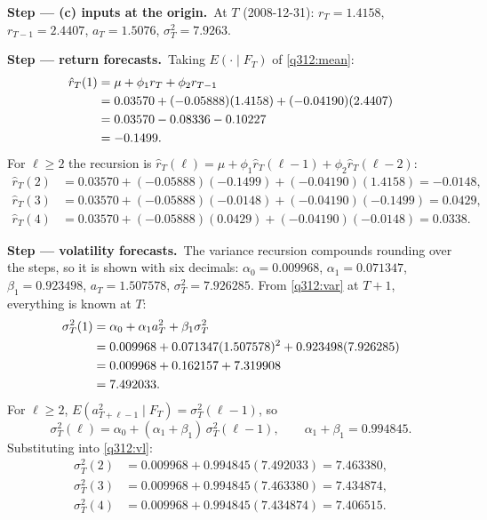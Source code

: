 \documentclass[11pt,a4paper]{article}
\newcommand{\passo}[2]{\par\smallskip\noindent\textbf{Step --- #1.}~#2}
\begin{document}
\begin{sol}
\passo{(c) inputs at the origin}{At $T$ (2008-12-31): $r_T=1.4158$, $r_{T-1}=2.4407$, $a_T=1.5076$, $\sigma_T^2=7.9263$.}
\passo{return forecasts}{Taking $E(\cdot\mid F_T)$ of \eqref{q312:mean}:}
\begin{align}
\hat r_T(1) &= \mu+\phi_1r_T+\phi_2r_{T-1} \label{q312:f1}\\
&= 0.03570+(-0.05888)(1.4158)+(-0.04190)(2.4407) \notag\\
&= 0.03570-0.08336-0.10227 \notag\\
&= -0.1499 . \notag
\end{align}
For $\ell\ge2$ the recursion is $\hat r_T(\ell)=\mu+\phi_1\hat r_T(\ell-1)+\phi_2\hat r_T(\ell-2)$:
\begin{align*}
\hat r_T(2) &= 0.03570+(-0.05888)(-0.1499)+(-0.04190)(1.4158) = -0.0148,\\
\hat r_T(3) &= 0.03570+(-0.05888)(-0.0148)+(-0.04190)(-0.1499) = 0.0429,\\
\hat r_T(4) &= 0.03570+(-0.05888)(0.0429)+(-0.04190)(-0.0148) = 0.0338 .
\end{align*}
\passo{volatility forecasts}{The variance recursion compounds rounding over the steps, so it is shown with six
decimals: $\alpha_0=0.009968$, $\alpha_1=0.071347$, $\beta_1=0.923498$, $a_T=1.507578$, $\sigma_T^2=7.926285$.
From \eqref{q312:var} at $T+1$, everything is known at $T$:}
\begin{align}
\sigma_T^2(1) &= \alpha_0+\alpha_1a_T^2+\beta_1\sigma_T^2 \label{q312:v1}\\
&= 0.009968+0.071347(1.507578)^2+0.923498(7.926285) \notag\\
&= 0.009968+0.162157+7.319908 \notag\\
&= 7.492033 . \notag
\end{align}
For $\ell\ge2$, $E(a_{T+\ell-1}^2\mid F_T)=\sigma_T^2(\ell-1)$, so
\begin{equation}\label{q312:vl} \sigma_T^2(\ell)=\alpha_0+(\alpha_1+\beta_1)\,\sigma_T^2(\ell-1),\qquad \alpha_1+\beta_1=0.994845 . \end{equation}
Substituting into \eqref{q312:vl}:
\begin{align*}
\sigma_T^2(2) &= 0.009968+0.994845(7.492033) = 7.463380,\\
\sigma_T^2(3) &= 0.009968+0.994845(7.463380) = 7.434874,\\
\sigma_T^2(4) &= 0.009968+0.994845(7.434874) = 7.406515 .
\end{align*}
\begin{center}\small
\begin{tabular}{lcccc}

\end{tabular}
\end{center}
\end{sol}
\end{document}
